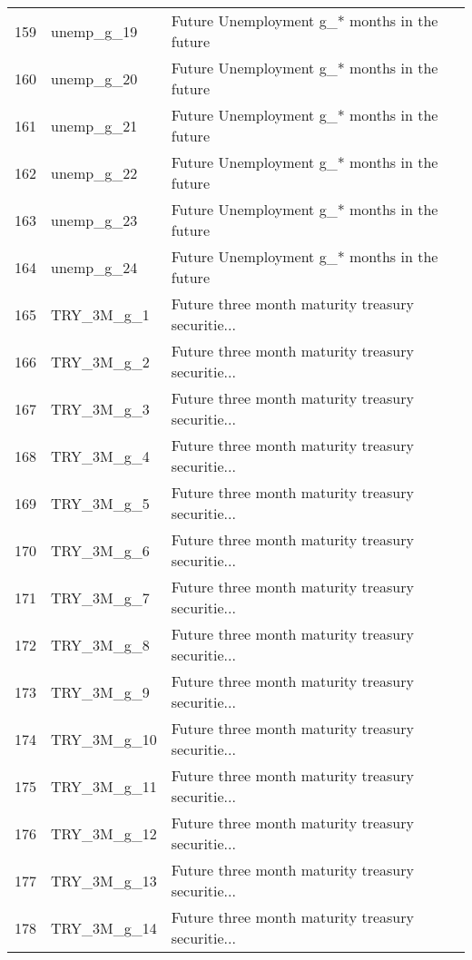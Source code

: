 \begin{tabular}{lll}
159 &                 unemp\_g\_19 &       Future Unemployment g\_* months in the future \\
160 &                 unemp\_g\_20 &       Future Unemployment g\_* months in the future \\
161 &                 unemp\_g\_21 &       Future Unemployment g\_* months in the future \\
162 &                 unemp\_g\_22 &       Future Unemployment g\_* months in the future \\
163 &                 unemp\_g\_23 &       Future Unemployment g\_* months in the future \\
164 &                 unemp\_g\_24 &       Future Unemployment g\_* months in the future \\
165 &                 TRY\_3M\_g\_1 &  Future three month maturity treasury securitie... \\
166 &                 TRY\_3M\_g\_2 &  Future three month maturity treasury securitie... \\
167 &                 TRY\_3M\_g\_3 &  Future three month maturity treasury securitie... \\
168 &                 TRY\_3M\_g\_4 &  Future three month maturity treasury securitie... \\
169 &                 TRY\_3M\_g\_5 &  Future three month maturity treasury securitie... \\
170 &                 TRY\_3M\_g\_6 &  Future three month maturity treasury securitie... \\
171 &                 TRY\_3M\_g\_7 &  Future three month maturity treasury securitie... \\
172 &                 TRY\_3M\_g\_8 &  Future three month maturity treasury securitie... \\
173 &                 TRY\_3M\_g\_9 &  Future three month maturity treasury securitie... \\
174 &                TRY\_3M\_g\_10 &  Future three month maturity treasury securitie... \\
175 &                TRY\_3M\_g\_11 &  Future three month maturity treasury securitie... \\
176 &                TRY\_3M\_g\_12 &  Future three month maturity treasury securitie... \\
177 &                TRY\_3M\_g\_13 &  Future three month maturity treasury securitie... \\
178 &                TRY\_3M\_g\_14 &  Future three month maturity treasury securitie... \\

\end{tabular}
